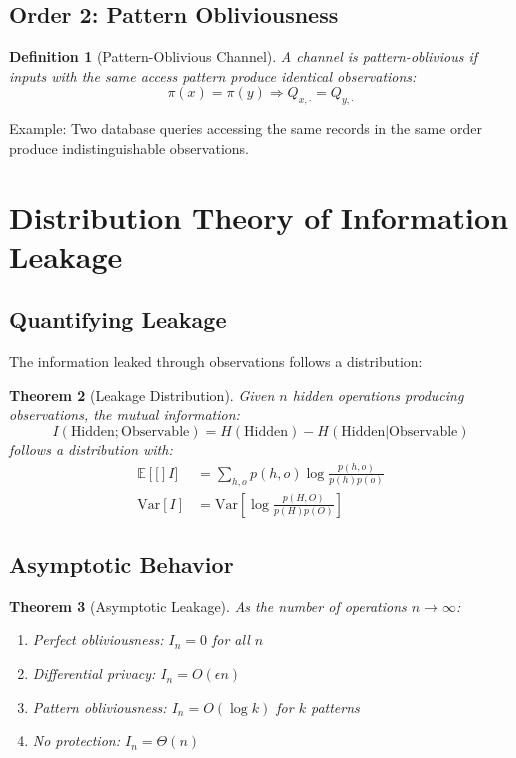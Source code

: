 \documentclass[11pt,final]{article}
\newtheorem{theorem}{Theorem}[section]
\newtheorem{definition}[theorem]{Definition}
\newcommand{\Pattern}[1]{\pi(#1)}
\newcommand{\Entropy}[1]{H(#1)}
\newcommand{\Expect}[1]{\mathbb{E}\left[#1\right]}
\begin{document}
\subsection{Order 2: Pattern Obliviousness}

\begin{definition}[Pattern-Oblivious Channel]
A channel is pattern-oblivious if inputs with the same access pattern produce identical observations:
\begin{equation}
\Pattern{x} = \Pattern{y} \Rightarrow Q_{x,\cdot} = Q_{y,\cdot}
\end{equation}
\end{definition}

Example: Two database queries accessing the same records in the same order produce indistinguishable observations.

\section{Distribution Theory of Information Leakage}

\subsection{Quantifying Leakage}

The information leaked through observations follows a distribution:

\begin{theorem}[Leakage Distribution]
Given $n$ hidden operations producing observations, the mutual information:
\begin{equation}
I(\text{Hidden}; \text{Observable}) = \Entropy{\text{Hidden}} - \Entropy{\text{Hidden}|\text{Observable}}
\end{equation}
follows a distribution with:
\begin{align}
\Expect[I] &= \sum_{h,o} p(h,o) \log \frac{p(h,o)}{p(h)p(o)} \\
\text{Var}[I] &= \text{Var}\left[\log \frac{p(H,O)}{p(H)p(O)}\right]
\end{align}
\end{theorem}

\subsection{Asymptotic Behavior}

\begin{theorem}[Asymptotic Leakage]
As the number of operations $n \to \infty$:
\begin{enumerate}
\item Perfect obliviousness: $I_n = 0$ for all $n$
\item Differential privacy: $I_n = O(\epsilon n)$
\item Pattern obliviousness: $I_n = O(\log k)$ for $k$ patterns
\item No protection: $I_n = \Theta(n)$
\end{enumerate}
\end{theorem}
\end{document}
